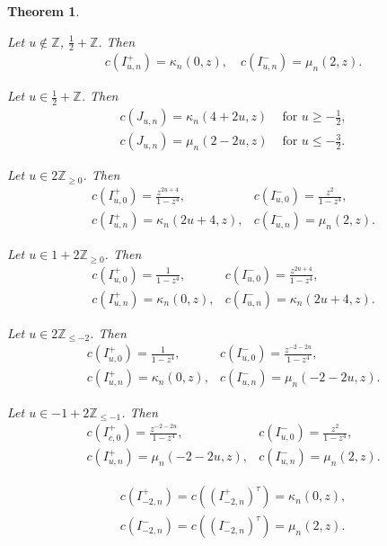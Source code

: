 \documentclass[12pt]{amsart}
\theoremstyle{plain} %
\newtheorem{theorem}[definition]{Theorem}
\newcommand {\ZZ} {\mathbb {Z}}
\newcommand{\half}{\frac{1}{2}}
\newcommand{\threehalfs}{\frac{3}{2}}
\begin{document}
\begin{theorem}\label{th916}
\item[(a)]Let $u\notin \ZZ$, $\half+\ZZ$. Then
\[\begin{array}{l}
c(I^+_{u,n})=\kappa_n(0,z), \quad c(I^-_{u,n})=\mu_{n}(2,z).
\end{array}\]
\item[(b)]Let $u\in \half+\ZZ$. Then
\[\begin{array}{ll}
c(J_{u,n})=\kappa_n(4+2u,z)&\text{~for~}u\geq -\half,\\
c(J_{u,n})=\mu_n(2-2u,z)&\text{~for~}u\leq -\threehalfs.
\end{array}\]
\item[(c)]Let $u\in 2\ZZ_{\geq 0}$. Then
\[\begin{array}{ll}
c(I^+_{u,0})=\frac{z^{2u+4}}{1-z^4},&c(I^-_{u,0})=\frac{z^{2}}{1-z^4},\\
c(I^+_{u,n})=\kappa_n(2u+4,z),&c(I^-_{u,n})=\mu_n(2,z).
\end{array}\]
\item[(d)]Let $u\in 1+2\ZZ_{\geq 0}$. Then
\[\begin{array}{ll}
c(I^+_{u,0})=\frac{1}{1-z^4},&c(I^-_{u,0})=\frac{z^{2u+4}}{1-z^4},\\
c(I^+_{u,n})=\kappa_n(0,z),&c(I^-_{u,n})=\kappa_n(2u+4,z).
\end{array}\]
\item[(e)]Let $u\in 2\ZZ_{\leq-2}$. Then
\[\begin{array}{ll}
c(I^+_{u,0})=\frac{1}{1-z^4},&c(I^-_{u,0})=\frac{z^{-2-2u}}{1-z^4},\\
c(I^+_{u,n})=\kappa_n(0,z),&c(I^-_{u,n})=\mu_n(-2-2u,z).
\end{array}\]
\item[(f)]Let $u\in -1+2\ZZ_{\leq-1}$. Then
\[\begin{array}{ll}
c(I^+_{c,0})=\frac{z^{-2-2u}}{1-z^4},&c(I^-_{u,0})=\frac{z^{2}}{1-z^4},\\
c(I^+_{u,n})=\mu_n(-2-2u,z),&c(I^-_{u,n})=\mu_n(2,z).
\end{array}\]
\item[(g)]
\[\begin{array}{l}
c(I^+_{-2,n})=c((I^+_{-2,n})^\tau)=\kappa_n(0,z),\\
c(I^-_{-2,n})=c((I^-_{-2,n})^\tau)=\mu_n(2,z).
\end{array}\]
\end{theorem}
\end{document}
